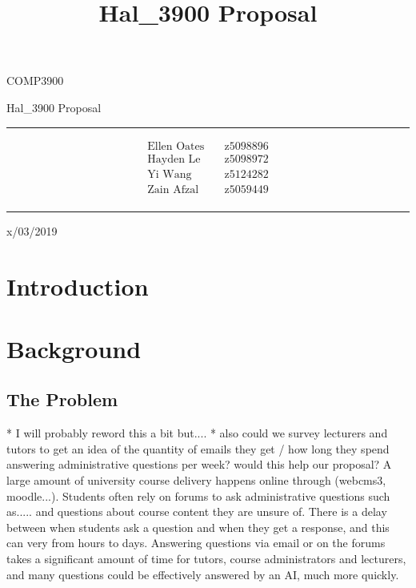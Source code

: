 \documentclass{article}
\title{Hal\_3900 Proposal}
\begin{document}
\begin{LARGE}
\begin{center}
\vspace*{15mm}

COMP3900

Hal\_3900 Proposal

\rule[4.5pt]{0.61\textwidth}{0.3pt}

\begin{align*}
  \text{Ellen Oates}    \quad   &\text{z5098896} \\
  \text{Hayden Le}      \quad   &\text{z5098972} \\
  \text{Yi Wang}        \quad   &\text{z5124282} \\
  \text{Zain Afzal}     \quad   &\text{z5059449} \\
\end{align*}

\rule[4.5pt]{0.61\textwidth}{0.3pt}

x/03/2019

\end{center}
\end{LARGE}
\newpage


\section{Introduction}


\section{Background}
\subsection{The Problem}
* I will probably reword this a bit but....
* also could we survey lecturers and tutors to get an idea of the quantity of emails they get / 
how long they spend answering administrative questions per week? would this help our proposal?
A large amount of university course delivery happens online through (webcms3, moodle...). Students 
often rely on forums to ask administrative questions such as.....  and questions about course content they are unsure of.
There is a delay between when students ask a question and when they get a response, and this can very from hours to days.
Answering questions via email or on the forums takes a significant amount of time for tutors, course administrators and lecturers, 
and many questions could be effectively answered by an AI, much more quickly.
\end{document}
